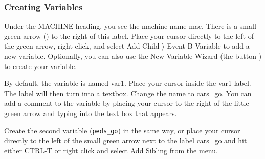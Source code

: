 \subsubsection{Creating Variables}

Under the \textsf{MACHINE} heading, you see the machine name \textsf{mac}. There is a small green arrow () to the right of this label. Place your cursor directly to the left of the green arrow, right click, and select \textsf{Add Child $\rangle$ Event-B Variable} to add a new variable. Optionally, you can also use the New Variable Wizard (the button ) to create your variable. 

By default, the variable is named \textsf{var1}. Place your cursor inside the \textsf{var1} label. The label will then turn into a textbox. Change the name to \textsf{cars\_go}. You can add a comment to the variable by placing your cursor to the right of the little green arrow and typing into the text box that appears.




Create the second variable (\texttt{peds\_go}) in the same way, or place your cursor directly to the left of the small green arrow next to the label \textsf{cars\_go} and hit either \textsf{CTRL-T} or right click and select \textsf{Add Sibling} from the menu.


